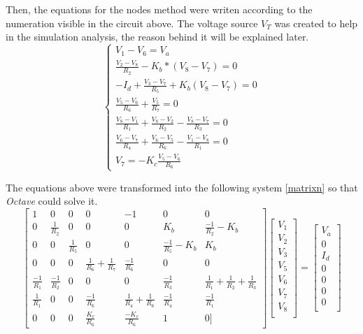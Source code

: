 \par Then, the equations for the nodes method were writen according to the numeration visible in the circuit above. The voltage source $V_T$ was created to help in the simulation analysis, the reason behind it will be explained later.
$$
\begin{cases} 
	V_1 - V_6 = V_a \\ 
	\frac{V_2 - V_8}{R_2} - K_b*(V_8 - V_7) = 0 \\
	-I_d + \frac{V_3 - V_7}{R_5} + K_{b}(V_8 - V_7) = 0 \\ 
	\frac{V_5 - V_6}{R_6} + \frac{V_5}{R_7} = 0 \\
	\frac{V_8 - V_1}{R_1} + \frac{V_8 - V_2}{R_2} - \frac{V_8 - V_7}{R_3}  = 0 \\
	\frac{V_6 - V_7}{R_4} + \frac{V_6 - V_5}{R_6} - \frac{V_1 - V_8}{R_1}  = 0 \\
	V_7 = -K_c \frac{V_5 - V_6}{R_6}
\label{system nodes}
\end{cases}
$$
\par The equations above were transformed into the following system \ref{matrixn} so that \textit{Octave} could solve it.
\begin{equation}
	\begin{bmatrix}
		1 & 0 & 0 & 0 &-1 & 0 & 0 \\
		0 & \frac{1}{R_2} & 0 & 0 & 0 & K_b & \frac{-1}{R_2}-K_b \\
		0 & 0 & \frac{1}{R_5} & 0 & 0 & \frac{-1}{R_5}-K_b & K_b \\
		0 & 0 & 0 & \frac{1}{R_6}+\frac{1}{R_7} & \frac{-1}{R_6} & 0 & 0 \\
		\frac{-1}{R_1} & \frac{-1}{R_2} & 0 & 0 & 0 & \frac{-1}{R_3} & \frac{1}{R_1}+\frac{1}{R_2}+\frac{1}{R_3} \\
		\frac{1}{R_1} & 0 & 0 & \frac{-1}{R_6} & \frac{1}{R_4}+\frac{1}{R_6} & \frac{-1}{R_4} & \frac{-1}{R_1} \\
		0 & 0 & 0 & \frac{K_c}{R_6} & \frac{-K_c}{R_6} & 1 & 0]
	\end{bmatrix}
	\begin{bmatrix}
		V_1     \\
		V_2     \\
		V_3  \\
		V_5  \\
		V_6   \\
		V_7   \\ 
		V_8     \\
	\end{bmatrix}
    =
	\begin{bmatrix}
		V_a     \\
		0     \\
		I_d  \\
		0     \\
		0     \\
		0     \\
		0     \\
	\end{bmatrix}
	\label{matrixn}
\end{equation}

